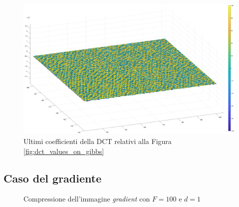 \begin{figure}
	\centering
	\includegraphics[width=1\linewidth]{figures/last_dct_values.eps}

	\caption{Ultimi coefficienti della DCT relativi alla Figura \ref{fig:dct_values_on_gibbs}}
	\label{fig:last_dct_values_gibbs}
\end{figure}
\FloatBarrier

\subsection{Caso del gradiente}
\begin{figure}%
	\centering
	\caption{Compressione dell'immagine \textit{gradient} con $F=100$ e $d=1$}%
	\label{fig:gradient}
\end{figure}

